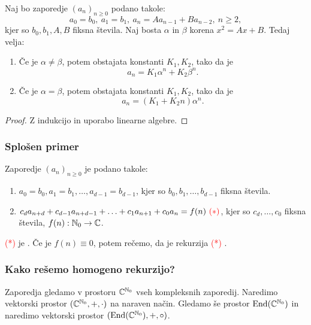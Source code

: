 \begin{izrek}
    Naj bo zaporedje $(a_n)_{n \geq 0}$ podano takole:
    $$a_0 = b_0, \ a_1 = b_1, \ a_n = A a_{n-1} + B a_{n-2}, \ n \geq 2,$$
    kjer so $b_0, b_1, A, B$ fiksna števila. 
    Naj bosta $\alpha$ in $\beta$ korena  $x^2 = Ax + B$. Tedaj velja:
    \begin{enumerate}
        \item Če je $\alpha \neq \beta$, potem obstajata konstanti $K_1, K_2$, tako da je 
        $$a_n = K_1 \alpha^n + K_2 \beta^n.$$
        \item Če je $\alpha = \beta$, potem obstajata konstanti $K_1, K_2$, tako da je 
        $$a_n = (K_1 + K_2n) \alpha^n.$$     
    \end{enumerate}
\end{izrek}

\begin{proof}
    Z indukcijo in uporabo linearne algebre.
\end{proof}

\subsubsection*{Splošen primer}
Zaporedje $(a_n)_{n \geq 0}$ je podano takole:
\begin{enumerate}
    \item $a_0 = b_0, a_1 = b_1, \ldots, a_{d-1} = b_{d-1}$, kjer so $b_0, b_1, \ldots, b_{d-1}$ fiksna števila.
    \item $c_da_{n+d} + c_{d-1}a_{n+d-1} + \ldots + c_1 a _{n+1} + c_0 a_n = f(n) \ \textcolor{red}{(*)}$, kjer so $c_d, \ldots, c_0$ fiksna števila, $f(n): \mathbb{N}_0 \to \mathbb{C}$.
\end{enumerate}

\begin{definicija}
    \textcolor{red}{(*)} je . Če je $f(n) \equiv 0$, potem rečemo, da je rekurzija \textcolor{red}{(*)} .
\end{definicija}

\subsubsection*{Kako rešemo homogeno rekurzijo?}
Zaporedja gledamo v prostoru $\mathbb{C}^{\mathbb{N}_0}$ vseh kompleksnih zaporedij. Naredimo vektorski prostor $(\mathbb{C}^{\mathbb{N}_0}, +, \cdot)$ na naraven način. Gledamo še prostor $\operatorname{End}(\mathbb{C}^{\mathbb{N}_0})$ in naredimo vektorski prostor $(\operatorname{End}(\mathbb{C}^{\mathbb{N}_0}), +, \circ)$.

